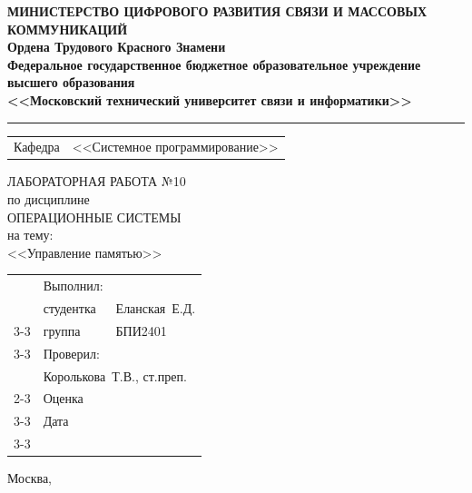 \thispagestyle{empty}

\begin{center}
	\textbf{МИНИСТЕРСТВО ЦИФРОВОГО РАЗВИТИЯ СВЯЗИ И МАССОВЫХ КОММУНИКАЦИЙ} \\
	\textbf{Ордена Трудового Красного Знамени \\
		Федеральное государственное бюджетное образовательное учреждение высшего образования \\
		<<Московский технический университет связи и информатики>>}
\end{center}
\rule{\linewidth}{1pt}

\vspace{0.3em}

\begin{center}
	\begin{tabularx}{0.6\textwidth}{p{1.2cm}X}
		Кафедра & \quad <<Системное программирование>> \\%
	\end{tabularx}
\end{center}

\vspace{10em}

\begin{center}
	\Large
	ЛАБОРАТОРНАЯ РАБОТА №10 \\
	\large
	по дисциплине \\
	ОПЕРАЦИОННЫЕ СИСТЕМЫ \\
	на тему: \\
	<<Управление памятью>>
\end{center}

\vspace{4em}

\renewcommand{\arraystretch}{1.1}
\begin{tabularx}{\textwidth}{p{10cm}p{2cm}p{3cm}}
	& Выполнил: & \\
	& студентка & Еланская~Е.Д. \\\cline{3-3} 
	& группа & БПИ2401 \\\cline{3-3} 
	& Проверил: &  \\
	& \multicolumn{2}{l}{Королькова~Т.В., ст.преп.} \\\cline{2-3}
	& Оценка & \\\cline{3-3} 
	& Дата & \\\cline{3-3} 
\end{tabularx}

\vspace{5em}

\begin{center}
	Москва,~\the\year
\end{center}
\clearpage


